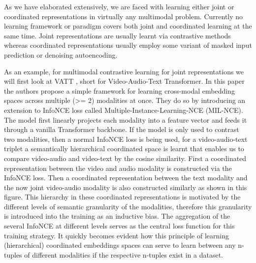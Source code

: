 \documentclass[
]{krantz}
\begin{document}
As we have elaborated extensively, we are faced with learning either joint or coordinated representations in virtually any multimodal problem. Currently no learning framework or paradigm covers both joint and coordinated learning at the same time. Joint representations are usually learnt via contrastive methods whereas coordinated representations usually employ some variant of masked input prediction or denoising autoencoding.

As an example, for multimodal contrastive learning for joint representations we will first look at VATT \citep{DBLP:conf/nips/AkbariYQCCCG21}, short for Video-Audio-Text Transformer. In this paper the authors propose a simple framework for learning cross-modal embedding spaces across multiple (\textgreater= 2) modalities at once. They do so by introducing an extension to InfoNCE loss called Multiple-Instance-Learning-NCE (MIL-NCE). The model first linearly projects each modality into a feature vector and feeds it through a vanilla Transformer backbone. If the model is only used to contrast two modalities, then a normal InfoNCE loss is being used, for a video-audio-text triplet a semantically hierarchical coordinated space is learnt that enables us to compare video-audio and video-text by the cosine similarity. First a coordinated representation between the video and audio modality is constructed via the InfoNCE \citep{DBLP:conf/icml/ChenK0H20} loss. Then a coordinated representation between the text modality and the now joint video-audio modality is also constructed similarly as shown in this figure. This hierarchy in these coordinated representations is motivated by the different levels of semantic granularity of the modalities, therefore this granularity is introduced into the training as an inductive bias. The aggregation of the several InfoNCE at different levels serves as the central loss function for this training strategy. It quickly becomes evident how this principle of learning (hierarchical) coordinated embeddings spaces can serve to learn between any n-tuples of different modalities if the respective n-tuples exist in a dataset.
\end{document}
